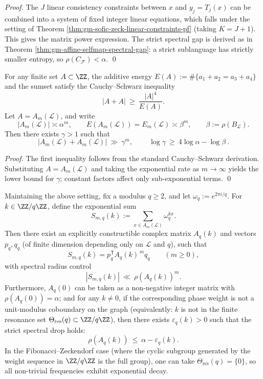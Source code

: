 \begin{proof}
The \(J\) linear consistency constraints between \(x\) and \(y_j=T_j(x)\) can be combined into a system of fixed integer linear equations, which falls under the setting of Theorem \ref{thm:gm-sofic-zeck-linear-constraints-pf} (taking \(K=J+1\)). This gives the matrix power expression.
The strict spectral gap is derived as in Theorem \ref{thm:gm-affine-selfmap-spectral-gap}: a strict sublanguage has strictly smaller entropy, so \(\rho(C_{\mathcal{F}})<\alpha\). \qed
\end{proof}

\begin{proposition}\label{prop:gm-energy-sumset-exponent}
For any finite set \(A\subset\ZZ\), the additive energy
\(
E(A):=\#\{a_1+a_2=a_3+a_4\}
\)
and the sumset satisfy the Cauchy--Schwarz inequality
\[
|A+A|\ \ge\ \frac{|A|^4}{E(A)}.
\]
Let \(A=A_m(\mathcal{L})\), and write
\[
|A_m(\mathcal{L})|\asymp \alpha^m,\qquad
E(A_m(\mathcal{L}))=E_m(\mathcal{L})\asymp \beta^m,\qquad \beta:=\rho(B_{\mathcal{L}}).
\]
Then there exists \(\gamma>1\) such that
\[
|A_m(\mathcal{L})+A_m(\mathcal{L})|\ \gg\ \gamma^m,
\qquad
\boxed{\ \log\gamma\ \ge\ 4\log\alpha-\log\beta\ }.
\]
\end{proposition}

\begin{proof}
The first inequality follows from the standard Cauchy--Schwarz derivation.
Substituting \(A=A_m(\mathcal{L})\) and taking the exponential rate as \(m\to\infty\) yields the lower bound for \(\gamma\); constant factors affect only sub-exponential terms. \qed
\end{proof}

\begin{theorem}\label{thm:gm-twisted-perron-fourier-decay}
Maintaining the above setting, fix a modulus \(q\ge 2\), and let \(\omega_q:=e^{2\pi i/q}\).
For \(k\in\ZZ/q\ZZ\), define the exponential sum
\[
S_{m,q}(k):=\sum_{x\in A_m(\mathcal{L})}\omega_q^{k x}.
\]
Then there exist an explicitly constructible complex matrix \(A_{q}(k)\) and vectors \(p_q,q_q\) (of finite dimension depending only on \(\mathcal{L}\) and \(q\)), such that
\[
S_{m,q}(k)=p_q^{\mathsf T}A_q(k)^{\,m}q_q\qquad(m\ge 0),
\]
with spectral radius control
\[
|S_{m,q}(k)|\ \ll\ \rho(A_q(k))^m.
\]
Furthermore, \(A_q(0)\) can be taken as a non-negative integer matrix with \(\rho(A_q(0))=\alpha\);
and for any \(k\neq 0\), if the corresponding phase weight is not a unit-modulus coboundary on the graph (equivalently: \(k\) is not in the finite resonance set \(\Theta_{\mathrm{res}}(q)\subset \ZZ/q\ZZ\)), then there exists \(\varepsilon_{q}(k)>0\) such that the strict spectral drop holds:
\[
\rho(A_q(k))\ \le\ \alpha-\varepsilon_q(k).
\]
In the Fibonacci--Zeckendorf case (where the cyclic subgroup generated by the weight sequence in \(\ZZ/q\ZZ\) is the full group), one can take \(\Theta_{\mathrm{res}}(q)=\{0\}\), so all non-trivial frequencies exhibit exponential decay.
\end{theorem}

